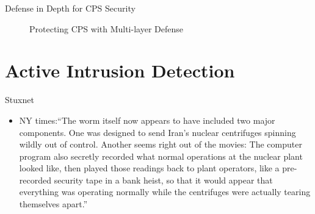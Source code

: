 \documentclass[10pt]{beamer}
\begin{document}
\begin{frame}{Defense in Depth for CPS Security}
  \begin{figure}[ht]
    \centering
  \caption{Protecting CPS with Multi-layer Defense}
  \end{figure}
\end{frame}

\section{Active Intrusion Detection}

\begin{frame}{Stuxnet}
  \begin{itemize}
    \item NY times:``The worm itself now appears to have included two major components. One was designed to send Iran's nuclear centrifuges spinning wildly out of control. Another seems right out of the movies: The computer program also \alert{secretly recorded what normal operations at the nuclear plant looked like, then played those readings back to plant operators}, like a pre-recorded security tape in a bank heist, so that it would appear that everything was operating normally while the centrifuges were actually tearing themselves apart.''
  \end{itemize}
\end{frame}
\end{document}
